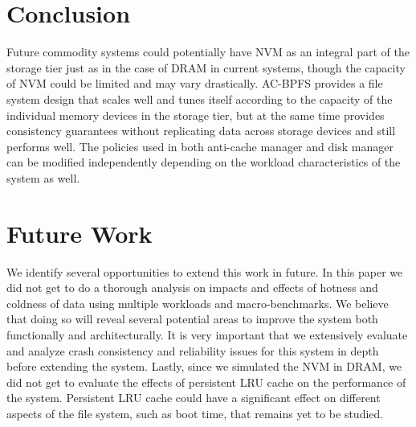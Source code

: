 \section{Conclusion}
\label{sec-conc}

Future commodity systems could potentially have NVM as an integral part of the storage tier just as in the case of DRAM in current systems, though the capacity of NVM could be limited and may vary drastically. AC-BPFS provides a file system design that scales well and tunes itself according to the capacity of the individual memory devices in the storage tier, but at the same time provides consistency guarantees without replicating data across storage devices and still performs well. The policies used in both anti-cache manager and disk manager can be modified independently depending on the workload characteristics of the system as well.

\section{Future Work}
\label{sec-conc}

We identify several opportunities to extend this work in future. In this paper we did not get to do a thorough analysis on impacts and effects of hotness and coldness of data using multiple workloads and macro-benchmarks. We believe that doing so will reveal several potential areas to improve the system both functionally and architecturally. It is very important that we extensively evaluate and analyze crash consistency and reliability issues for this system in depth before extending the system. Lastly, since we simulated the NVM in DRAM, we did not get to evaluate the effects of persistent LRU cache on the performance of the system. Persistent LRU cache could have a significant effect on different aspects of the file system, such as boot time, that remains yet to be studied.
